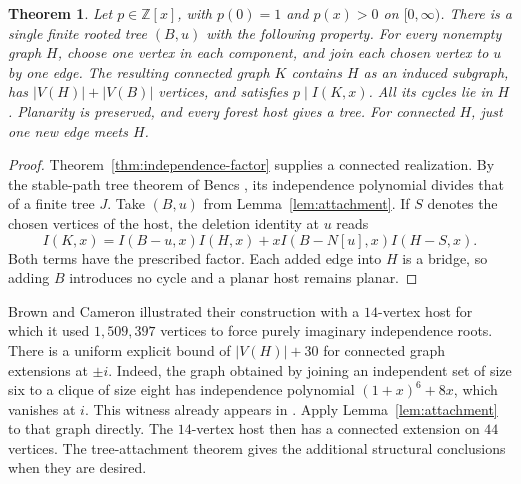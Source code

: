 \documentclass[11pt,a4paper]{article}
\newtheorem{theorem}{Theorem}[section]
\begin{document}
\begin{theorem}\label{thm:tree-extension}
Let $p\in\mathbb Z[x]$, with $p(0)=1$ and $p(x)>0$ on $[0,\infty)$.
There is a single finite rooted tree $(B,u)$ with the following
property. For every nonempty graph $H$, choose one vertex in each
component, and join each chosen vertex to $u$ by one edge.
The resulting connected graph $K$ contains $H$ as an induced subgraph,
has $|V(H)|+|V(B)|$ vertices, and satisfies $p\mid I(K,x)$.
All its cycles lie in $H$. Planarity is preserved, and every forest
host gives a tree. For connected $H$, just one new edge meets $H$.
\end{theorem}
\begin{proof}
Theorem~\ref{thm:independence-factor} supplies a connected realization.
By the stable-path tree theorem of Bencs \cite{bencs}, its independence
polynomial divides that of a finite tree $J$. Take $(B,u)$ from
Lemma~\ref{lem:attachment}. If $S$ denotes the chosen vertices of the
host, the deletion identity at $u$ reads
\[
 I(K,x)=I(B-u,x)I(H,x)+xI(B-N[u],x)I(H-S,x).
\]
Both terms have the prescribed factor. Each added edge into $H$ is a
bridge, so adding $B$ introduces no cycle and a planar host remains planar.
\end{proof}

Brown and Cameron \cite[pp.~9--10 of the preprint]{browncameron}
illustrated their construction with a $14$-vertex host for which it used
$1{,}509{,}397$ vertices to force purely imaginary independence roots.
There is a uniform explicit bound of $|V(H)|+30$ for connected graph
extensions at $\pm i$. Indeed, the graph obtained by joining an independent
set of size six to a clique of size eight has independence polynomial
$(1+x)^6+8x$, which vanishes at $i$. This witness already appears in
\cite{browncameron}. Apply Lemma~\ref{lem:attachment} to that graph
directly. The $14$-vertex host then has a connected extension on $44$
vertices. The tree-attachment theorem gives the additional structural
conclusions when they are desired.
\end{document}
